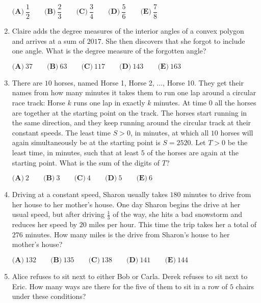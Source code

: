 \documentclass{article}
\begin{document}
\begin{enumerate}[label=\arabic*., itemsep=0.5em]
\( \textbf{(A)}\ \dfrac{1}{2} \qquad\textbf{(B)}\ \dfrac{2}{3} \qquad\textbf{(C)}\ \dfrac{3}{4} \qquad\textbf{(D)}\ \dfrac{5}{6} \qquad\textbf{(E)}\ \dfrac{7}{8} \)\par \vspace{0.5em}\item Claire adds the degree measures of the interior angles of a convex polygon and arrives at a sum of \(2017\). She then discovers that she forgot to include one angle. What is the degree measure of the forgotten angle?

\(\textbf{(A)}\ 37\qquad\textbf{(B)}\ 63\qquad\textbf{(C)}\ 117\qquad\textbf{(D)}\ 143\qquad\textbf{(E)}\ 163\)\par \vspace{0.5em}\item There are \(10\) horses, named Horse 1, Horse 2, \(\ldots\), Horse 10. They get their names from how many minutes it takes them to run one lap around a circular race track: Horse \(k\) runs one lap in exactly \(k\) minutes. At time 0 all the horses are together at the starting point on the track. The horses start running in the same direction, and they keep running around the circular track at their constant speeds. The least time \(S > 0\), in minutes, at which all \(10\) horses will again simultaneously be at the starting point is \(S = 2520\). Let  \(T>0\) be the least time, in minutes, such that at least \(5\) of the horses are again at the starting point. What is the sum of the digits of  \(T\)?

\(\textbf{(A)}\ 2\qquad\textbf{(B)}\ 3\qquad\textbf{(C)}\ 4\qquad\textbf{(D)}\ 5\qquad\textbf{(E)}\ 6\)\par \vspace{0.5em}\item Driving at a constant speed, Sharon usually takes \(180\) minutes to drive from her house to her mother's house. One day Sharon begins the drive at her usual speed, but after driving \(\frac{1}{3}\) of the way, she hits a bad snowstorm and reduces her speed by \(20\) miles per hour. This time the trip takes her a total of \(276\) minutes. How many miles is the drive from Sharon's house to her mother's house?

\(\textbf{(A)}\ 132 \qquad\textbf{(B)}\ 135 \qquad\textbf{(C)}\ 138 \qquad\textbf{(D)}\ 141 \qquad\textbf{(E)}\ 144\)\par \vspace{0.5em}\item Alice refuses to sit next to either Bob or Carla. Derek refuses to sit next to Eric. How many ways are there for the five of them to sit in a row of \(5\) chairs under these conditions?


\end{enumerate}
\end{document}

